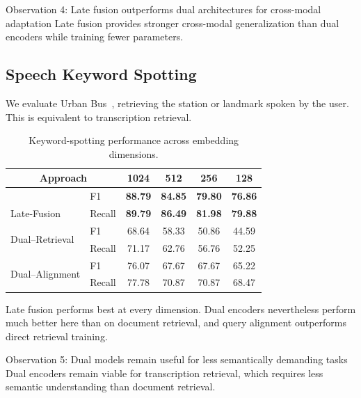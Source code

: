 \begin{insightbox}{Observation 4: Late fusion outperforms dual architectures for cross-modal adaptation}
Late fusion provides stronger cross-modal generalization than dual encoders while training fewer parameters.
\end{insightbox}

\subsection{Speech Keyword Spotting}
We evaluate Urban Bus~\citep{urbanbus}, retrieving the station or landmark spoken by the user. This is equivalent to transcription retrieval.

\begin{table}[ht]
    \centering
    \begin{tabular}{llcccc}
        \toprule
        \multicolumn{2}{c}{\textbf{Approach}} & \textbf{1024} & \textbf{512} & \textbf{256} & \textbf{128} \\
        \midrule
        \cellcolor[HTML]{EEE0CC} & \cellcolor[HTML]{EEE0CC}F1 & \cellcolor[HTML]{EEE0CC}\textbf{88.79} & \cellcolor[HTML]{EEE0CC}\textbf{84.85} & \cellcolor[HTML]{EEE0CC}\textbf{79.80} & \cellcolor[HTML]{EEE0CC}\textbf{76.86} \\
        \multirow{-2}{*}{\cellcolor[HTML]{EEE0CC}Late-Fusion} & \cellcolor[HTML]{EEE0CC}Recall & \cellcolor[HTML]{EEE0CC}\textbf{89.79} & \cellcolor[HTML]{EEE0CC}\textbf{86.49} & \cellcolor[HTML]{EEE0CC}\textbf{81.98} & \cellcolor[HTML]{EEE0CC}\textbf{79.88} \\
        \multirow{2}{*}{Dual--Retrieval} & F1 & 68.64 & 58.33 & 50.86 & 44.59 \\
        & Recall & 71.17 & 62.76 & 56.76 & 52.25 \\
        \multirow{2}{*}{Dual--Alignment} & F1 & 76.07 & 67.67 & 67.67 & 65.22 \\
        & Recall & 77.78 & 70.87 & 70.87 & 68.47 \\
        \bottomrule
    \end{tabular}
    \caption{Keyword-spotting performance across embedding dimensions.}
    \label{tab:kws-mrl}
\end{table}

Late fusion performs best at every dimension. Dual encoders nevertheless perform much better here than on document retrieval, and query alignment outperforms direct retrieval training.

\begin{insightbox}{Observation 5: Dual models remain useful for less semantically demanding tasks}
Dual encoders remain viable for transcription retrieval, which requires less semantic understanding than document retrieval.
\end{insightbox}

